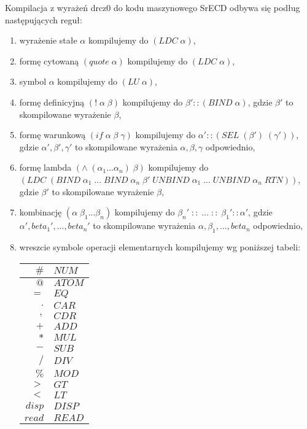 \documentclass[a4paper]{article}
\begin{document}
Kompilacja z wyrażeń drcz0 do kodu maszynowego SrECD odbywa się podług następujących reguł:
\begin{enumerate}
\item wyrażenie stałe $\alpha$ kompilujemy do $(LDC \; \alpha)$,
\item formę cytowaną $(quote \; \alpha)$ kompilujemy do $(LDC \; \alpha)$,
\item symbol $\alpha$ kompilujemy do $(LU \; \alpha)$,
\item formę definicyjną $(!\;\alpha\; \beta)$ kompilujemy do $\beta' :: (BIND\;\alpha )$, gdzie $\beta' $ to skompilowane wyrażenie $\beta$,
\item formę warunkową $(if\;\alpha\;\beta\;\gamma)$ kompilujemy do
$\alpha' :: (SEL\; (\beta')\; (\gamma'))$, gdzie $\alpha', \beta', \gamma'$ to skompilowane wyrażenia $\alpha, \beta, \gamma$ odpowiednio,
\item formę lambda $(\wedge \;(\alpha_1 ... \alpha_n)\;\beta)$ kompilujemy do\\
$(LDC\; (BIND\; \alpha_1\; ... \;BIND\; \alpha_n\; \beta'\; UNBIND\; \alpha_1 \;...\; UNBIND\; \alpha_n\; RTN))$,
gdzie $\beta'$ to skompilowane wyrażenie $\beta$,
\item kombinację $(\alpha \; \beta_1 ... \beta_n)$ kompilujemy do
$\beta_n'\; ::\; ...\; ::\; \beta_1' :: \alpha'$, gdzie $\alpha',beta_1',...,beta_n'$ to skompilowane wyrażenia
$\alpha,\beta_1,...,beta_n$ odpowiednio,
\item wreszcie symbole operacji elementarnych kompilujemy wg poniższej tabeli:

\begin{tabular} {r|l}
$\#$ & $NUM$\\
\hline
$@$ & $ATOM$ \\
\hline
$=$ & $EQ$\\
\hline
$.$ & $CAR$ \\
\hline
$,$ & $CDR$ \\
\hline
$+$ & $ADD$ \\
\hline
$*$ & $MUL$ \\
\hline
$-$ & $SUB$ \\
\hline
$/$ & $DIV$ \\
\hline
$\%$ & $MOD$ \\
\hline
$>$ & $GT$ \\
\hline
$<$ & $LT$ \\
\hline
$disp$ & $DISP$ \\
\hline
$read$ & $READ$ \\
\end{tabular}

\end{enumerate}
\end{document}

